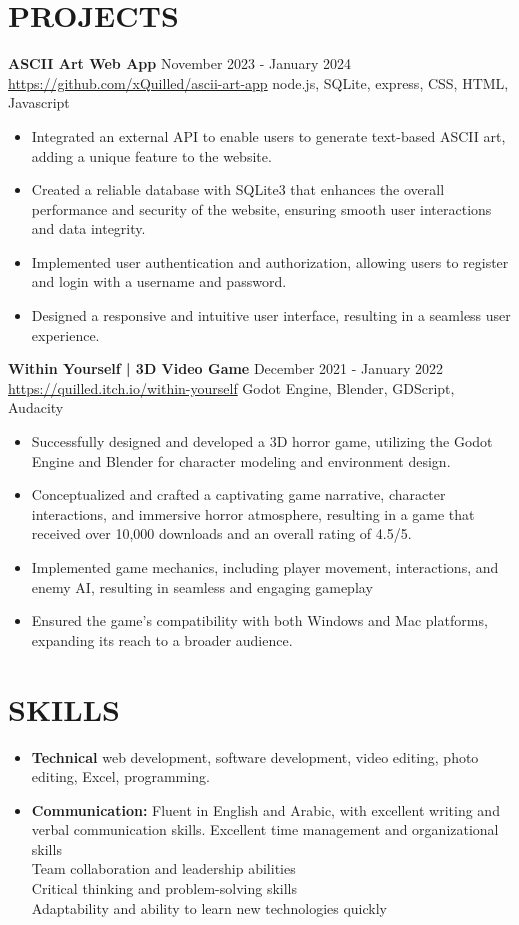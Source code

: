 \documentclass[a4paper,10pt]{extarticle}
\begin{document}
\section*{PROJECTS}
\noindent
\textbf{ASCII Art Web App} \hfill November 2023 - January 2024\\
\url{https://github.com/xQuilled/ascii-art-app} \hfill node.js, SQLite, express, CSS, HTML, Javascript
\begin{itemize}
	\item Integrated an external API to enable users to generate text-based ASCII art, adding a unique feature to the website.
	\item Created a reliable database with SQLite3 that enhances the overall performance and security of the website, ensuring smooth user interactions and data integrity.
	\item Implemented user authentication and authorization, allowing users to register and login with a username and password.
	\item Designed a responsive and intuitive user interface, resulting in a seamless user experience.
\end{itemize}


\noindent
\textbf{Within Yourself | 3D Video Game} \hfill December 2021 - January 2022\\
\url{https://quilled.itch.io/within-yourself} \hfill Godot Engine, Blender, GDScript, Audacity
\begin{itemize}
	\item Successfully designed and developed a 3D horror game, utilizing the Godot
	      Engine and Blender for character modeling and environment design.
	\item Conceptualized and crafted a captivating game narrative, character interactions,
	      and immersive horror atmosphere, resulting in a game that received over 10,000 downloads and an overall rating of 4.5/5.
	\item Implemented game mechanics, including player movement, interactions, and
	      enemy AI, resulting in seamless and engaging gameplay
	\item Ensured the game's compatibility with both Windows and Mac platforms,
	      expanding its reach to a broader audience.
\end{itemize}


\section*{SKILLS}
\begin{itemize}
    \item \textbf{Technical} web development, software development, video editing, photo editing, Excel, programming.
	\item \textbf{Communication:} Fluent in English and Arabic, with excellent writing and verbal communication skills.
    Excellent time management and organizational skills \\
    Team collaboration and leadership abilities\\
    Critical thinking and problem-solving skills \\
    Adaptability and ability to learn new technologies quickly
\end{itemize}
\end{document}
